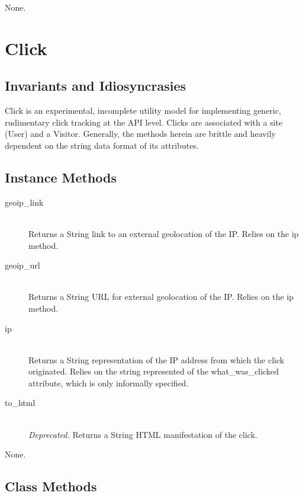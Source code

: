 \documentclass[11pt]{book}
\begin{document}
None.







\section{Click}

\subsection{Invariants and Idiosyncrasies}

Click is an experimental, incomplete utility model for implementing generic, rudimentary click tracking at the API level.  Clicks are associated with a site (User) and a Visitor.  Generally, the methods herein are brittle and heavily dependent on the string data format of its attributes.

\subsection{Instance Methods}

\begin{description}
	\item[geoip\_link]  \hfill \\
  Returns a String link to an external geolocation of the IP.  Relies on the ip method.

	\item[geoip\_url]  \hfill \\
  Returns a String URL for external geolocation of the IP.  Relies on the ip method.
  
  \item[ip]  \hfill \\
  Returns a String representation of the IP address from which the click originated.  Relies on the string represented of the what\_was\_clicked attribute, which is only informally specified.
  
  \item[to\_html]  \hfill \\
  \emph{Deprecated.}  Returns a String HTML manifestation of the click.

\end{description}

None.

\subsection{Class Methods}
\end{document}
